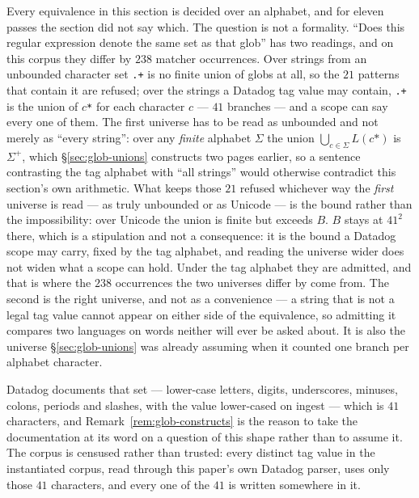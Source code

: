 Every equivalence in this section is decided over an alphabet, and for eleven passes the
section did not say which. The question is not a formality. ``Does this regular
expression denote the same set as that glob'' has two readings, and on this corpus they
differ by $238$ matcher occurrences. Over strings from an unbounded character set
\texttt{.+} is no finite union of globs at all, so the $21$ patterns that contain it are
refused; over the strings a Datadog tag value may contain, \texttt{.+} is the union of
$c$\texttt{*} for each character $c$ --- $41$ branches --- and a scope can say every one
of them. The first universe has to be read as unbounded and not merely as ``every
string'': over any \emph{finite} alphabet $\Sigma$ the union
$\bigcup_{c\in\Sigma}L(c\texttt{*})$ is $\Sigma^{+}$, which \S\ref{sec:glob-unions}
constructs two pages earlier, so a sentence contrasting the tag alphabet with ``all
strings'' would otherwise contradict this section's own arithmetic. What keeps those
$21$ refused whichever way the \emph{first} universe is read --- as truly unbounded
or as Unicode --- is the bound rather than the impossibility: over Unicode the union is
finite but exceeds $B$. $B$ stays at $41^2$ there, which is a stipulation and not a
consequence: it is the bound a Datadog scope may carry, fixed by the tag alphabet, and
reading the universe wider does not widen what a scope can hold. Under the tag alphabet they are admitted, and that is
where the $238$ occurrences the two universes differ by come from. The second is the right
universe, and not as a convenience --- a string that is not a legal tag value cannot
appear on either side of the equivalence, so admitting it compares two languages on
words neither will ever be asked about. It is also the universe \S\ref{sec:glob-unions}
was already assuming when it counted one branch per alphabet character.

Datadog documents that set --- lower-case letters, digits, underscores, minuses, colons,
periods and slashes, with the value lower-cased on ingest --- which is $41$ characters,
and Remark~\ref{rem:glob-constructs} is the reason to take the documentation at its word
on a question of this shape rather than to assume it. The corpus is censused rather than
trusted: every distinct tag value in the instantiated corpus, read through this paper's
own Datadog parser, uses only those $41$ characters, and every one of the $41$ is written
somewhere in it.

